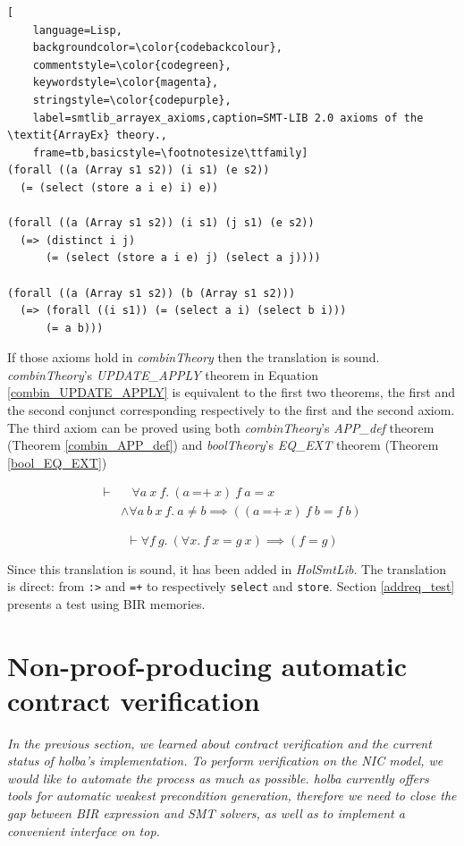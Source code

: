 \documentclass{kththesis}
\begin{document}
{\begin{lstlisting}[
    language=Lisp,
    backgroundcolor=\color{codebackcolour},
    commentstyle=\color{codegreen},
    keywordstyle=\color{magenta},
    stringstyle=\color{codepurple},
    label=smtlib_arrayex_axioms,caption=SMT-LIB 2.0 axioms of the \textit{ArrayEx} theory.,
    frame=tb,basicstyle=\footnotesize\ttfamily]
(forall ((a (Array s1 s2)) (i s1) (e s2))
  (= (select (store a i e) i) e)) 

(forall ((a (Array s1 s2)) (i s1) (j s1) (e s2))
  (=> (distinct i j)
      (= (select (store a i e) j) (select a j))))

(forall ((a (Array s1 s2)) (b (Array s1 s2)))
  (=> (forall ((i s1)) (= (select a i) (select b i)))
      (= a b)))
\end{lstlisting}

If those axioms hold in \textit{combinTheory} then the translation is sound. \textit{combinTheory}'s \textit{UPDATE\_APPLY} theorem in Equation \ref{combin_UPDATE_APPLY} is equivalent to the first two theorems, the first and the second conjunct corresponding respectively to the first and the second axiom. The third axiom can be proved using both \textit{combinTheory}'s \textit{APP\_def} theorem (Theorem \ref{combin_APP_def}) and \textit{boolTheory}'s \textit{EQ\_EXT} theorem (Theorem \ref{bool_EQ_EXT})

\begin{equation}
    \begin{split}
        \vdash &  ~~~~ \forall a~x~f.~(a~\text{=+}~x)~f~a = x\\
               & \land \forall a~b~x~f.~a \neq b \implies ((a~\text{=+}~x)~f~b = f~b)
    \end{split}
    \label{combin_UPDATE_APPLY}
\end{equation}

\begin{equation}
    \vdash \forall f~g.~(\forall x.~f~x = g~x) \implies (f = g)
    \label{bool_EQ_EXT}
\end{equation}

Since this translation is sound, it has been added in \textit{HolSmtLib}. The translation is direct: from \texttt{:>} and \texttt{=+} to respectively \texttt{select} and \texttt{store}. Section \ref{addreq_test} presents a test using BIR memories.



\chapter{Non-proof-producing automatic contract verification} \label{impl-non-pp-wp-lib}
\vspace{-1cm}
\textit{In the previous section, we learned about contract verification and the current status of \gls{holba}'s implementation. To perform verification on the \gls{NIC} model, we would like to automate the process as much as possible. \gls{holba} currently offers tools for automatic weakest precondition generation, therefore we need to close the gap between BIR expression and SMT solvers, as well as to implement a convenient interface on top.}

}
\end{document}
